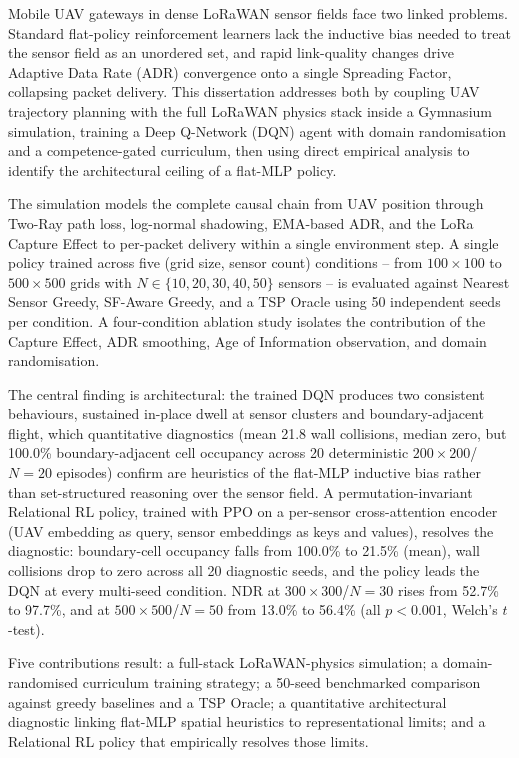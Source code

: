 Mobile UAV gateways in dense LoRaWAN sensor fields face two linked problems. Standard flat-policy reinforcement learners lack the inductive bias needed to treat the sensor field as an unordered set, and rapid link-quality changes drive Adaptive Data Rate (ADR) convergence onto a single Spreading Factor, collapsing packet delivery. This dissertation addresses both by coupling UAV trajectory planning with the full LoRaWAN physics stack inside a Gymnasium simulation, training a Deep Q-Network (DQN) agent with domain randomisation and a competence-gated curriculum, then using direct empirical analysis to identify the architectural ceiling of a flat-MLP policy.

The simulation models the complete causal chain from UAV position through Two-Ray path loss, log-normal shadowing, EMA-based ADR, and the LoRa Capture Effect to per-packet delivery within a single environment step. A single policy trained across five (grid size, sensor count) conditions -- from $100{\times}100$ to $500{\times}500$ grids with $N \in \{10, 20, 30, 40, 50\}$ sensors -- is evaluated against Nearest Sensor Greedy, SF-Aware Greedy, and a TSP Oracle using 50 independent seeds per condition. A four-condition ablation study isolates the contribution of the Capture Effect, ADR smoothing, Age of Information observation, and domain randomisation.

The central finding is architectural: the trained DQN produces two consistent behaviours, sustained in-place dwell at sensor clusters and boundary-adjacent flight, which quantitative diagnostics (mean 21.8 wall collisions, median zero, but 100.0\% boundary-adjacent cell occupancy across 20 deterministic $200{\times}200$/$N{=}20$ episodes) confirm are heuristics of the flat-MLP inductive bias rather than set-structured reasoning over the sensor field. A permutation-invariant Relational RL policy, trained with PPO on a per-sensor cross-attention encoder (UAV embedding as query, sensor embeddings as keys and values), resolves the diagnostic: boundary-cell occupancy falls from 100.0\% to 21.5\% (mean), wall collisions drop to zero across all 20 diagnostic seeds, and the policy leads the DQN at every multi-seed condition. NDR at $300{\times}300$/$N{=}30$ rises from 52.7\% to 97.7\%, and at $500{\times}500$/$N{=}50$ from 13.0\% to 56.4\% (all $p < 0.001$, Welch's $t$-test).

Five contributions result: a full-stack LoRaWAN-physics simulation; a domain-randomised curriculum training strategy; a 50-seed benchmarked comparison against greedy baselines and a TSP Oracle; a quantitative architectural diagnostic linking flat-MLP spatial heuristics to representational limits; and a Relational RL policy that empirically resolves those limits.
